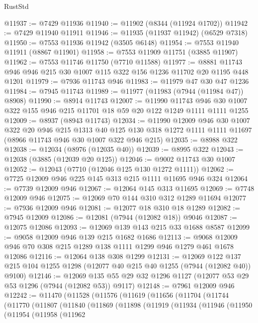 \begin{lexlean}{RustStd}
\begin{coremodule}
@11937 := @7429 @11936
@11940 := @11902 (@8344 (@11924 @1702))
@11942 := @7429 @11940 @11911
@11946 := @11935 (@11937 @11942) (@6529 @7318)
@11950 := @7553 @11936 @11942 (@3505 @6148)
@11954 := @7553 @11940 @11911 (@8867 @11901)
@11958 := @7553 @11909 @11751 (@3885 @11907)
@11962 := @7553 @11746 @11750 (@7710 @11588)
@11977 := @8881 @11743 @946 @946 @215 @30 @1007 @115 @322 @156 @1236 @11702 @20 @1195 @448 @1201
@11979 := @7936 @11743 @946
@11983 := @11979 @47 @30 @47 @1236
@11984 := @7945 @11743
@11989 := @11977 (@11983 (@7944 (@11984 @47)) @8908)
@11990 := @8914 @11743
@12007 := @11990
    @11743
    @946
    @30
    @1007
    @322
    @155
    @946
    @215
    @11701
    @18
    @59
    @20
    @122
    @1249
    @1111
    @1111
    @1255
@12009 := @8937 (@8943 @11743)
@12034 := @11990
    @12009
    @946
    @30
    @1007
    @322
    @20
    @946
    @215
    @1313
    @40
    @125
    @130
    @318
    @1272
    @1111
    @1111
    @11697
    (@8966 @11743 @946 @30 @1007 @322 @946 @215)
@12035 := @8988 @322
@12038 := @12034 (@8976 (@12035 @40))
@12039 := @8995 @322
@12043 := @12038 (@3885 (@12039 @20 @125))
@12046 := @9002 @11743 @30 @1007
@12052 := @12043 (@7710 (@12046 @125 @130 @1272 @1111))
@12062 := @7725 @12009 @946 @225 @145 @313 @215 @1111 @11695 @946 @324
@12064 := @7739 @12009 @946
@12067 := @12064 @145 @313 @11695
@12069 := @7748 @12009 @946
@12075 := @12069 @70 @144 @310 @312 @1289 @11694
@12077 := @7936 @12009 @946
@12081 := @12077 @18 @310 @18 @1289
@12082 := @7945 @12009
@12086 := @12081 (@7944 (@12082 @18)) @9046
@12087 := @12075 @12086
@12093 := @12069 @139 @143 @215 @33 @1688 @8587
@12099 := @9058 @12009 @946 @139 @215 @1682 @1686
@12113 := @9068 @12009 @946 @70 @308 @215 @1289 @138 @1111 @1299 @946 @1279 @461 @1678 @12086
@12116 := @12064 @138 @308 @1299
@12131 := @12069
    @122
    @137
    @215
    @104
    @1255
    @1298
    (@12077 @40 @215 @40 @1255 (@7944 (@12082 @40)) @9100)
@12146 := @12069 @135 @55 @29 @32 @1296 @1127 (@12077 @53 @29 @53 @1296 (@7944 (@12082 @53)) @9117)
@12148 := @7961 @12009 @946
@12242 := @11470
    (@11528
      (@11576
        (@11619
          (@11656
            (@11704
              (@11744
                (@11770
                  (@11807
                    (@11840
                      (@11869
                        (@11898
                          (@11919
                            (@11934
                              (@11946
                                (@11950
                                  (@11954
                                    (@11958
                                      (@11962

\end{coremodule}
\end{lexlean}
